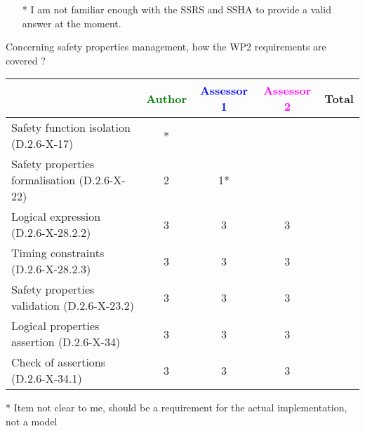 \begin{assessor2}
  \begin{itemize}
  \item[*] I am not familiar enough with the SSRS and SSHA to provide a
    valid answer at the moment.
  \end{itemize}  
\end{assessor2}


Concerning safety properties management, how the WP2 requirements are covered ?

\begin{tabular}{|l | c | c | c | c|}
\hline
& \textcolor{green}{Author} & \textcolor{blue}{Assessor 1} & \textcolor{magenta}{Assessor 2} & Total \\
\hline
Safety function isolation (D.2.6-X-17) &* & & & \\
\hline
Safety properties formalisation (D.2.6-X-22) &2 &1* & & \\
\hline
Logical expression (D.2.6-X-28.2.2) &3 &3 &3 & \\
\hline
Timing constraints (D.2.6-X-28.2.3) &3 &3 &3 & \\
\hline
Safety properties validation (D.2.6-X-23.2) &3 &3 &3 & \\
\hline
Logical properties assertion (D.2.6-X-34) &3 &3 &3 & \\
\hline
Check of assertions (D.2.6-X-34.1) &3 &3 &3 & \\
\hline
\end{tabular}


\begin{author_comment}
* Item not clear to me, should be a requirement for the actual implementation, not a model
\end{author_comment}

